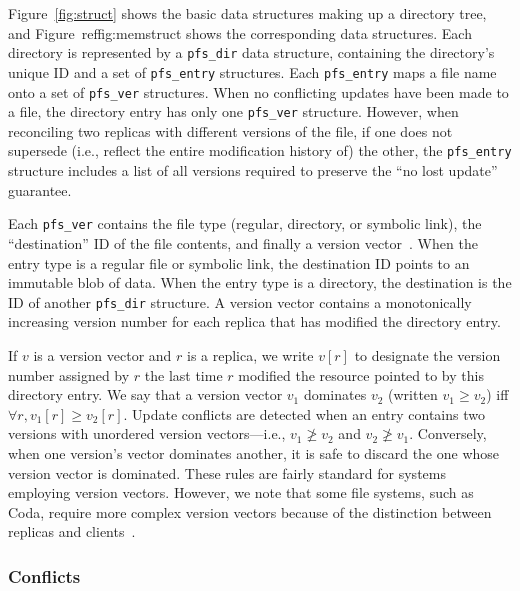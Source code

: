 

Figure~\ref{fig:struct} shows the basic data structures making up a
directory tree, and Figure~ref{fig:memstruct} shows the corresponding
data structures.  Each directory is represented by a \texttt{pfs\_dir}
data structure, containing the directory's unique ID and a set of
\texttt{pfs\_entry} structures.  Each \texttt{pfs\_entry} maps a file
name onto a set of \texttt{pfs\_ver} structures.  When no conflicting
updates have been made to a file, the directory entry has only one
\texttt{pfs\_ver} structure.  However, when reconciling two replicas
with different versions of the file, if one does not supersede (i.e.,
reflect the entire modification history of) the other, the
\texttt{pfs\_entry} structure includes a list of all versions required
to preserve the ``no lost update'' guarantee.

Each \texttt{pfs\_ver} contains the file type (regular, directory, or
symbolic link), the ``destination'' ID of the file contents, and
finally a version vector~\cite{parker:inconsistency}.  When the entry
type is a regular file or symbolic link, the destination ID points to
an immutable blob of data.  When the entry type is a directory, the
destination is the ID of another \texttt{pfs\_dir} structure.  A
version vector contains a monotonically increasing version number for
each replica that has modified the directory entry.

If $v$ is a version vector and $r$ is a replica, we write $v[r]$ to
designate the version number assigned by $r$ the last time $r$
modified the resource pointed to by this directory entry.  We say that
a version vector $v_1$ dominates $v_2$ (written $v_1\ge v_2$) iff
$\forall r, v_1[r]\ge v_2[r]$.  Update conflicts are detected when an
entry contains two versions with unordered version vectors---i.e.,
$v_1\not\ge v_2$ and $v_2\not\ge v_1$.  Conversely, when one version's
vector dominates another, it is safe to discard the one whose version
vector is dominated.  These rules are fairly standard for systems
employing version vectors.  However, we note that some file systems,
such as Coda, require more complex version vectors because of the
distinction between replicas and clients~\cite{satyanarayanan:coda}.

\subsubsection{Conflicts}

